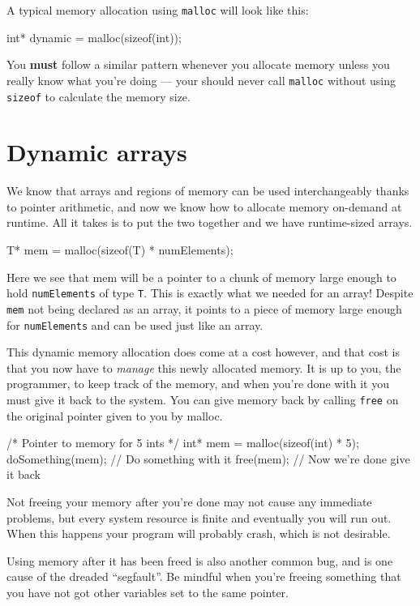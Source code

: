 A typical memory allocation using \lstinline!malloc! will look like this:
\begin{codeinline}
int* dynamic = malloc(sizeof(int));
\end{codeinline}

You \textbf{must} follow a similar pattern whenever you allocate memory unless you really know what you're doing --- your should never call \lstinline!malloc! without using \lstinline!sizeof! to calculate the memory size.

\section{Dynamic arrays}

We know that arrays and regions of memory can be used interchangeably thanks to pointer arithmetic, and now we know how to allocate memory on-demand at runtime.
All it takes is to put the two together and we have runtime-sized arrays.

\begin{codeinline}
T* mem = malloc(sizeof(T) * numElements);
\end{codeinline}

Here we see that mem will be a pointer to a chunk of memory large enough to hold \texttt{numElements} of type \texttt{T}.
This is exactly what we needed for an array!
Despite \lstinline!mem! not being declared as an array, it points to a piece of memory large enough for \lstinline!numElements! and can be used just like an array.

This dynamic memory allocation does come at a cost however, and that cost is that you now have to \emph{manage} this newly allocated memory.
It is up to you, the programmer, to keep track of the memory, and when you're done with it you must give it back to the system.
You can give memory back by calling \texttt{free} on the original pointer given to you by malloc.

\begin{codeblock}
/* Pointer to memory for 5 ints */
int* mem = malloc(sizeof(int) * 5);
doSomething(mem); // Do something with it
free(mem); // Now we're done give it back
\end{codeblock}

Not freeing your memory after you're done may not cause any immediate problems, but every system resource is finite and eventually you will run out.
When this happens your program will probably crash, which is not desirable.

Using memory after it has been freed is also another common bug, and is one cause of the dreaded ``segfault''.
Be mindful when you're freeing something that you have not got other variables set to the same pointer.

